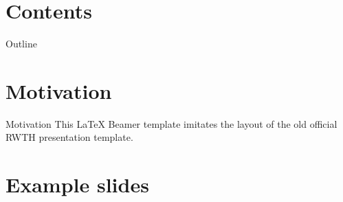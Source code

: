 
\section*{Contents}
\begin{frame}[t]{Outline}
  \tableofcontents[hideallsubsections]
\end{frame}

\section*{Motivation}



\begin{frame}{Motivation}
  This \LaTeX{} Beamer template imitates the layout of the old official RWTH presentation template.
\end{frame}

\section{Example slides}

